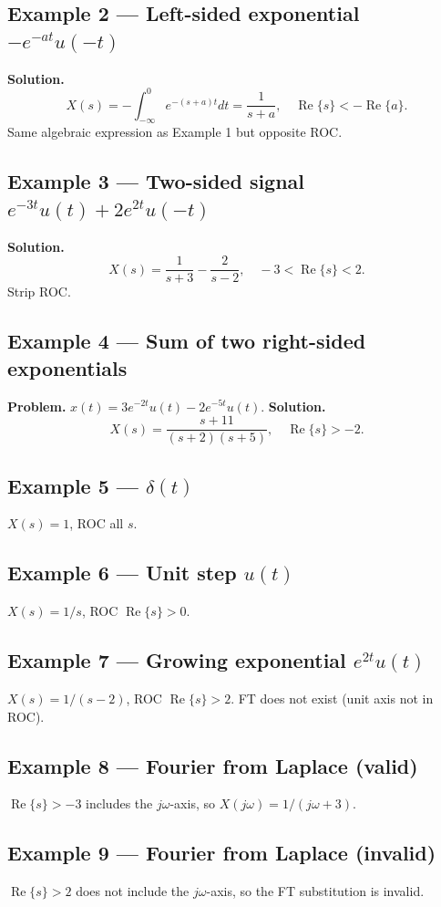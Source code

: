 \documentclass[11pt]{article}
\newcommand{\Real}{\operatorname{Re}}
\begin{document}
\subsection{Example 2 --- Left-sided exponential $-e^{-at}u(-t)$}
\textbf{Solution.}
\[X(s)=-\int_{-\infty}^{0}e^{-(s+a)t}dt=\frac{1}{s+a},\quad\Real\{s\}<-\Real\{a\}.\]
Same algebraic expression as Example 1 but opposite ROC.

\subsection{Example 3 --- Two-sided signal $e^{-3t}u(t)+2e^{2t}u(-t)$}
\textbf{Solution.}
\[X(s)=\frac{1}{s+3}-\frac{2}{s-2},\quad -3<\Real\{s\}<2.\]
Strip ROC.

\subsection{Example 4 --- Sum of two right-sided exponentials}
\textbf{Problem.} $x(t)=3e^{-2t}u(t)-2e^{-5t}u(t)$.
\textbf{Solution.}
\[X(s)=\frac{s+11}{(s+2)(s+5)},\quad\Real\{s\}>-2.\]

\subsection{Example 5 --- $\delta(t)$}
$X(s)=1$, ROC all $s$.

\subsection{Example 6 --- Unit step $u(t)$}
$X(s)=1/s$, ROC $\Real\{s\}>0$.

\subsection{Example 7 --- Growing exponential $e^{2t}u(t)$}
$X(s)=1/(s-2)$, ROC $\Real\{s\}>2$. FT does not exist (unit axis not in ROC).

\subsection{Example 8 --- Fourier from Laplace (valid)}
$\Real\{s\}>-3$ includes the $j\omega$-axis, so $X(j\omega)=1/(j\omega+3)$.

\subsection{Example 9 --- Fourier from Laplace (invalid)}
$\Real\{s\}>2$ does not include the $j\omega$-axis, so the FT substitution is invalid.
\end{document}
